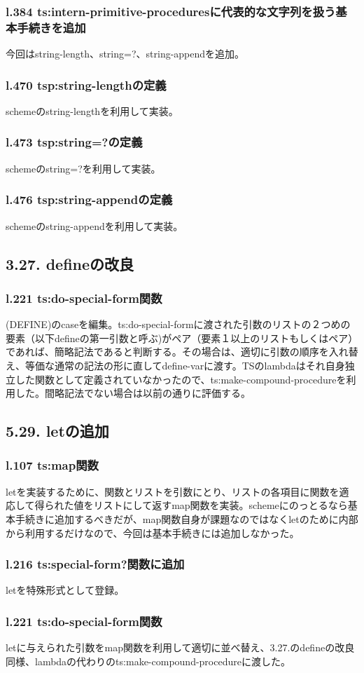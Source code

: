 \documentclass{jarticle}
\begin{document}
\subsubsection{l.384 ts:intern-primitive-proceduresに代表的な文字列を扱う基本手続きを追加}
今回はstring-length、string=?、string-appendを追加。
\subsubsection{l.470 tsp:string-lengthの定義}
schemeのstring-lengthを利用して実装。\par
\subsubsection{l.473 tsp:string=?の定義}
schemeのstring=?を利用して実装。\par
\subsubsection{l.476 tsp:string-appendの定義}
schemeのstring-appendを利用して実装。\par

\subsection{3.27. defineの改良}
\subsubsection{l.221 ts:do-special-form関数}
(DEFINE)のcaseを編集。ts:do-special-formに渡された引数のリストの２つめの要素（以下defineの第一引数と呼ぶ)がペア（要素１以上のリストもしくはペア）であれば、簡略記法であると判断する。その場合は、適切に引数の順序を入れ替え、等価な通常の記法の形に直してdefine-varに渡す。TSのlambdaはそれ自身独立した関数として定義されていなかったので、ts:make-compound-procedureを利用した。間略記法でない場合は以前の通りに評価する。\par

\subsection{5.29. letの追加}
\subsubsection{l.107 ts:map関数}
letを実装するために、関数とリストを引数にとり、リストの各項目に関数を適応して得られた値をリストにして返すmap関数を実装。schemeにのっとるなら基本手続きに追加するべきだが、map関数自身が課題なのではなくletのために内部から利用するだけなので、今回は基本手続きには追加しなかった。\par
\subsubsection{l.216 ts:special-form?関数に追加}
letを特殊形式として登録。\par
\subsubsection{l.221 ts:do-special-form関数}
letに与えられた引数をmap関数を利用して適切に並べ替え、3.27.のdefineの改良同様、lambdaの代わりのts:make-compound-procedureに渡した。\par
\end{document}
